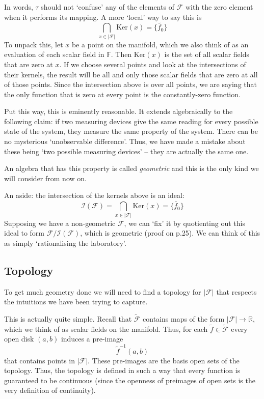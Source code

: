\documentclass[oneside,english]{amsbook}
\numberwithin{section}{chapter}
\theoremstyle{plain}
\theoremstyle{definition}
\begin{document}
In words, $\tau$ should not `confuse' any of the elements of $\mathscr{F}$ with the zero element when it performs its mapping. A more `local' way to say this is
\[
	\bigcap_{x\in|\mathscr{F}|}\text{Ker}(x) = \{\tilde{f_0}\}
\]
To unpack this, let $x$ be a point on the manifold, which we also think of as an evaluation of each scalar field in $\mathbb{F}$. Then  $\text{Ker}(x)$ is the set of all scalar fields that are zero at $x$. If we choose several points and look at the intersections of their kernels, the result will be all and only those scalar fields that are zero at all of those points. Since the intersection above is over all points, we are saying that the only function that is zero at every point is the constantly-zero function.

Put this way, this is eminently reasonable. It extends algebraically to the following claim: if two measuring devices give the same reading for every possible state of the system, they measure the same property of the system. There can be no mysterious `unobservable difference'. Thus, we have made a mistake about these being `two possible measuring devices' -- they are actually the same one.

An algebra that has this property is called \emph{geometric} and this is the only kind we will consider from now on.

An aside: the intersection of the kernels above is an ideal:
\[
\mathscr{I}(\mathscr{F}) = \bigcap_{x\in|\mathscr{F}|}\text{Ker}(x) = \{\tilde{f_0}\}
\]
Supposing we have a non-geometric $\mathscr{F}$, we can `fix' it by quotienting out this ideal to form $\mathscr{F}/\mathscr{I}(\mathscr{F})$, which is geometric (proof on p.25). We can think of this as simply `rationalising the laboratory'.

\subsection{Topology}

To get much geometry done we will need to find a topology for $|\mathscr{F}|$ that respects the intuitions we have been trying to capture. 

This is actually quite simple. Recall that $\tilde{\mathscr{F}}$ contains maps of the form $|\mathscr{F}|\to\mathbb{R}$, which we think of as scalar fields on the manifold. Thus, for each $\tilde{f}\in \tilde{\mathscr{F}}$ every open disk $(a, b)$ induces a pre-image
\[
	\tilde{f}^{-1}(a, b)
\]
that contains points in $|\mathscr{F}|$. These pre-images are the basis open sets of the topology. Thus, the topology is defined in such a way that every function is guaranteed to be continuous (since the openness of preimages of open sets is the very definition of continuity).
\end{document}
